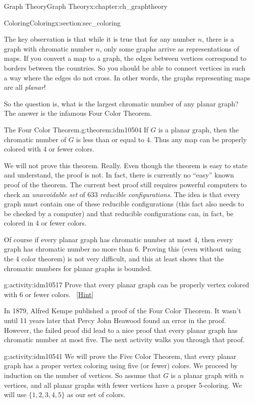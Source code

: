 \documentclass[oneside,10pt,]{book}
\numberwithin{equation}{chapter}
\begin{document}
\begin{chapterptx}{Graph Theory}{}{Graph Theory}{}{}{x:chapter:ch_graphtheory}
\begin{sectionptx}{Coloring}{}{Coloring}{}{}{x:section:sec_coloring}
\begin{introduction}{}
\par
The key observation is that while it is true that for any number \(n\), there is a graph with chromatic number \(n\), only some graphs arrive as representations of maps. If you convert a map to a graph, the edges between vertices correspond to borders between the countries. So you should be able to connect vertices in such a way where the edges do not cross. In other words, the graphs representing maps are all \emph{planar}!%
\par
So the question is, what is the largest chromatic number of any planar graph? The answer is the infamous Four Color Theorem.%
\begin{theorem}{The Four Color Theorem.}{}{g:theorem:idm10504}%
 If \(G\) is a planar graph, then the chromatic number of \(G\) is less than or equal to 4. Thus any map can be properly colored with 4 or fewer colors.%
\end{theorem}
We will not prove this theorem. Really. Even though the theorem is easy to state and understand, the proof is not. In fact, there is currently no ``easy'' known proof of the theorem. The current best proof still requires powerful computers to check an \emph{unavoidable set} of 633 \emph{reducible configurations}. The idea is that every graph must contain one of these reducible configurations (this fact also needs to be checked by a computer) and that reducible configurations can, in fact, be colored in 4 or fewer colors.%
\par
Of course if every planar graph has chromatic number at most 4, then every graph has chromatic number no more than 6.  Proving this (even without using the 4 color theorem) is not very difficult, and this at least shows that the chromatic numbers for planar graphs is bounded.%
\begin{activity}{}{g:activity:idm10517}%
Prove that every planar graph can be properly vertex colored with 6 or fewer colors.%
\qquad~\hfill{\tiny\hyperlink{g:hint:idm10520-back}{[Hint]}}\end{activity}
In 1879, Alfred Kempe published a proof of the Four Color Theorem.  It wasn't until 11 years later that Percy John Heawood found an error in the proof.  However, the failed proof did lead to a nice proof that every planar graph has chromatic number at most five.  The next activity walks you through that proof.%
\begin{activity}{}{g:activity:idm10541}%
We will prove the Five Color Theorem, that every planar graph has a proper vertex coloring using five (or fewer) colors.  We proceed by induction on the number of vertices.  So assume that \(G\) is a planar graph with \(n\) vertices, and all planar graphs with fewer vertices have a proper 5-coloring.  We will use \(\{1,2,3,4,5\}\) as our set of colors.%

\end{activity}
\end{introduction}
\end{sectionptx}
\end{chapterptx}
\end{document}
